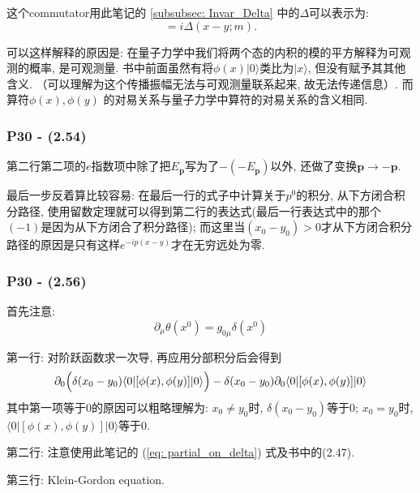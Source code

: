 \documentclass[cn,hazy,blue,11pt,device=normal,chinesefont=founder]{elegantnote}
\begin{document}
这个commutator用此笔记的 \ref{subsubsec: Invar_Delta} 中的$\Delta$可以表示为: 
\begin{equation}
  [\phi(x), \phi(y)] = i\Delta(x-y; m). 
\end{equation}

\begin{remark}
  可以这样解释的原因是: 在量子力学中我们将两个态的内积的模的平方解释为可观测的概率, 是可观测量. 
  书中前面虽然有将$\phi(x) |0\rangle$类比为$|x\rangle$, 但没有赋予其其他含义. 
  （可以理解为这个传播振幅无法与可观测量联系起来, 故无法传递信息）. 而算符$\phi(x), \phi(y)$
  的对易关系与量子力学中算符的对易关系的含义相同. 
\end{remark}

\subsubsection{P30 - (2.54)}

第二行第二项的$e$指数项中除了把$E_\mathbf{p}$写为了$-(-E_\mathbf{p})$以外, 还做了变换$\mathbf{p} \rightarrow -\mathbf{p}$. 

最后一步反着算比较容易: 在最后一行的式子中计算关于$p^0$的积分, 从下方闭合积分路径, 使用留数定理就可以得到第二行的表达式(最后一行表达式中的那个$(-1)$是因为从下方闭合了积分路径); 而这里当$(x_0 - y_0)>0$才从下方闭合积分路径的原因是只有这样$e^{-ip(x - y)}$才在无穷远处为零. 

\subsubsection{P30 - (2.56)}

首先注意: 
\begin{equation}
  \partial_\mu \theta(x^0) = g_{0\mu} \delta(x^0) \label{eq: partial_on_delta}
\end{equation}

第一行: 对阶跃函数求一次导, 再应用分部积分后会得到
\begin{equation}
  \partial_0 \Bigl(\delta(x_0 - y_0)\langle 0|[\phi(x), \phi(y)]|0\rangle \Bigr)-\delta(x_0 - y_0)\partial_0\langle 0|[\phi(x), \phi(y)]|0\rangle
\end{equation}
其中第一项等于0的原因可以粗略理解为: $x_0 \neq y_0$时, $\delta(x_0 - y_0)$等于0; $x_0 = y_0$时, $\langle 0|[\phi(x), \phi(y)]|0\rangle$等于0. 

第二行: 注意使用此笔记的 (\ref{eq: partial_on_delta}) 式及书中的(2.47). 

第三行: Klein-Gordon equation. 
\end{document}
